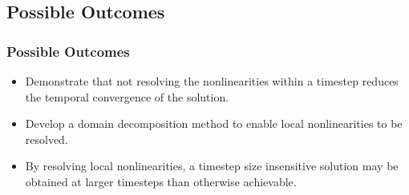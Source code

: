 \documentclass[compress,xcolor=table]{beamer}
\begin{document}
\subsection[Possible Outcomes]{Possible Outcomes}
\begin{frame}
\frametitle{Possible Outcomes}

\begin{itemize}
\item{Demonstrate that not resolving the nonlinearities within a timestep reduces the temporal convergence of the solution.}
\item{Develop a domain decomposition method to enable local nonlinearities to be resolved.}
\item{By resolving local nonlinearities, a timestep size insensitive solution may be obtained at larger timesteps than otherwise achievable.}
\end{itemize}

\end{frame}
\end{document}
